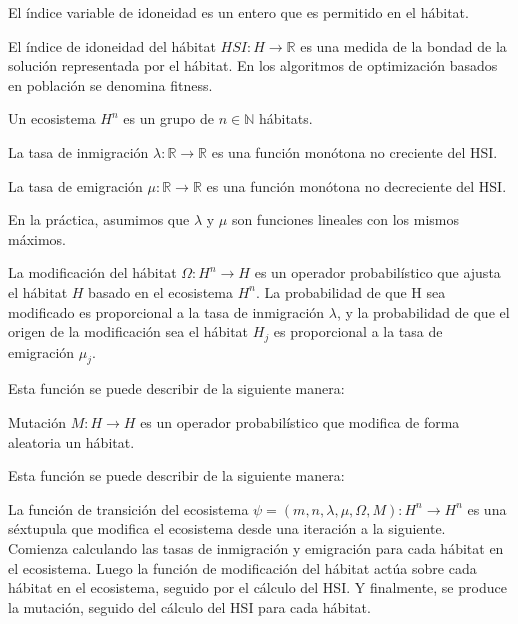 \begin{mydef}
    El índice variable de idoneidad es un entero que es permitido en el hábitat. 
\end{mydef}

\begin{mydef}
    El índice de idoneidad del hábitat $HSI: H \rightarrow \mathbb{R}$ es una medida de la bondad de la solución representada por el hábitat. En los algoritmos de optimización basados en población se denomina fitness.
\end{mydef}

\begin{mydef}
    Un ecosistema $H^{n}$ es un grupo de $n \in \mathbb{N}$ hábitats.
\end{mydef}

\begin{mydef}
    La tasa de inmigración $\lambda: \mathbb{R} \rightarrow \mathbb{R}$ es una función monótona no creciente del HSI.
\end{mydef}

\begin{mydef}
    La tasa de emigración $\mu: \mathbb{R} \rightarrow \mathbb{R}$ es una función monótona no decreciente del HSI.
\end{mydef}

En la práctica, asumimos que $\lambda$ y $\mu$ son funciones lineales con los mismos máximos.

\begin{mydef}
    La modificación del hábitat $\Omega: H^{n} \rightarrow H$ es un operador probabilístico que ajusta el hábitat $H$ basado en el 
    ecosistema $H^{n}$. 
    La probabilidad de que H sea modificado es proporcional a la tasa de inmigración $\lambda$, y la probabilidad de que el origen de 
    la modificación sea el hábitat $H_{j}$ es proporcional a la tasa de emigración $\mu_j$. 
\end{mydef}

    Esta función se puede describir de la siguiente manera:

\begin{mydef}
    Mutación $M: H \rightarrow H$ es un operador probabilístico que modifica de forma aleatoria un hábitat.
\end{mydef}

    Esta función se puede describir de la siguiente manera:

\begin{mydef}
    La función de transición del ecosistema $\psi = (m,n,\lambda,\mu,\Omega,M): H^{n} \rightarrow H^{n}$ es una 
    séxtupula que modifica el ecosistema desde una iteración a la siguiente. \\
    Comienza calculando las tasas de inmigración y emigración para cada hábitat en el ecosistema. Luego la función de modificación del hábitat 
    actúa sobre cada hábitat en el ecosistema, seguido por el cálculo del HSI. Y finalmente, se produce la mutación, seguido del cálculo del HSI 
    para cada hábitat.
\end{mydef}


